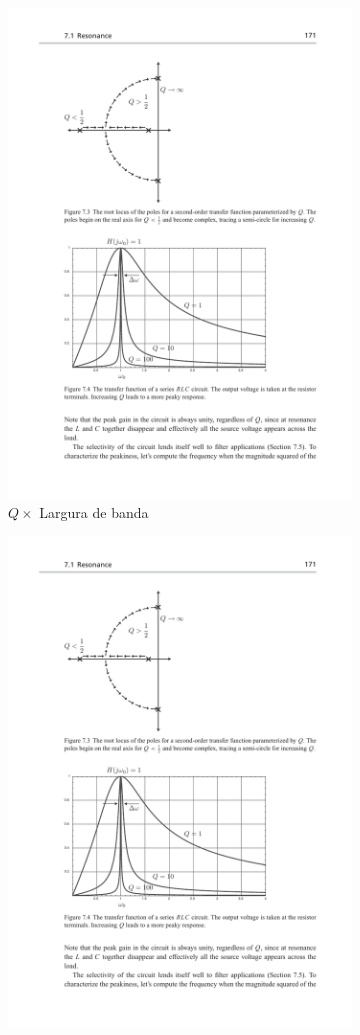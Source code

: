 \begin{frame}{}


\begin{figure}[H]
    \centering
    \caption{$Q \times$ largura de banda e sua relação com polos}
    \begin{subfigure}[H]{.49\textwidth}
        \centering
        \includegraphics[width=\textwidth]{fig/q-band.pdf}
        \caption{$Q \times$ Largura de banda}
        \label{f-q-banda}
    \end{subfigure}
    \hfil
    \begin{subfigure}[H]{.49\textwidth}
        \centering
        \includegraphics[width=.5\textwidth]{fig/q-poles.pdf}

\end{subfigure}
\end{figure}
\end{frame}
